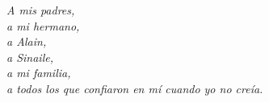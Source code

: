 \begin{dedication}
	\textit{
		A mis padres,\\ 
		a mi hermano,\\
		a Alain, \\
		a Sinaile,\\
		a mi familia,\\
		a todos los que confiaron en mí cuando yo no creía.}
\end{dedication}